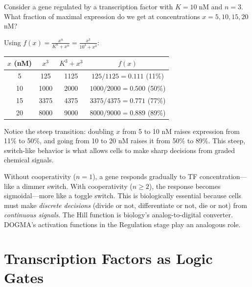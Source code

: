\begin{example}
Consider a gene regulated by a transcription factor with $K = 10\;\text{nM}$ and $n = 3$. What fraction of maximal expression do we get at concentrations $x = 5, 10, 15, 20$ nM?

Using $f(x) = \frac{x^n}{K^n + x^n} = \frac{x^3}{10^3 + x^3}$:

\begin{center}
\renewcommand{\arraystretch}{1.2}
\begin{tabular}{cccc}
\toprule
$x$ (nM) & $x^3$ & $K^3 + x^3$ & $f(x)$ \\
\midrule
5  & 125   & 1125  & $125/1125 = 0.111$ \quad (11\%) \\
10 & 1000  & 2000  & $1000/2000 = 0.500$ \quad (50\%) \\
15 & 3375  & 4375  & $3375/4375 = 0.771$ \quad (77\%) \\
20 & 8000  & 9000  & $8000/9000 = 0.889$ \quad (89\%) \\
\bottomrule
\end{tabular}
\end{center}

Notice the steep transition: doubling $x$ from 5 to 10 nM raises expression from 11\% to 50\%, and going from 10 to 20 nM raises it from 50\% to 89\%. This steep, switch-like behavior is what allows cells to make sharp decisions from graded chemical signals.
\end{example}

\begin{bioinsight}
Without cooperativity ($n=1$), a gene responds gradually to TF concentration---like a dimmer switch. With cooperativity ($n \geq 2$), the response becomes sigmoidal---more like a toggle switch. This is biologically essential because cells must make \emph{discrete decisions} (divide or not, differentiate or not, die or not) from \emph{continuous signals}. The Hill function is biology's analog-to-digital converter. DOGMA's activation functions in the Regulation stage play an analogous role.
\end{bioinsight}

\section{Transcription Factors as Logic Gates}
\label{sec:tf-logic}

